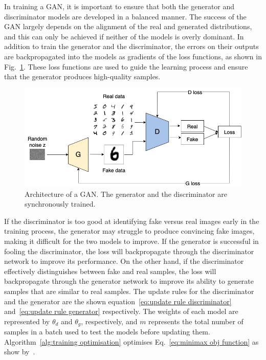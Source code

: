 \noindent In training a GAN, it is important to ensure that both the generator and discriminator models are developed in a balanced manner. The success of the GAN largely depends on the alignment of the real and generated distributions, and this can only be achieved if neither of the models is overly dominant.
In addition to train the generator and the discriminator, the errors on their outputs are backpropagated into the models as gradients of the loss functions, as shown in Fig.~\ref{fig:GAN architecture w loss}. These loss functions are used to guide the learning process and ensure that the generator produces high-quality samples.
\begin{figure}[!ht]
\centering
  \includegraphics[scale=0.45]{figures/gan-architecture.png}
  \caption{Architecture of a GAN. The generator and the discriminator are synchronously trained.}
  \label{fig:GAN architecture w loss}
\end{figure}
If the discriminator is too good at identifying fake versus real images early in the training process, the generator may struggle to produce convincing fake images, making it difficult for the two models to improve. If the generator is successful in fooling the discriminator, the loss will backpropagate through the discriminator network to improve its performance. On the other hand, if the discriminator effectively distinguishes between fake and real samples, the loss will backpropagate through the generator network to improve its ability to generate samples that are similar to real samples.
The update rules for the discriminator and the generator are the shown equation~\ref{eq:update rule discriminator} and~\ref{eq:update rule generator} respectively. The weights of each model are represented by $\theta_d$ and $\theta_g$, respectively, and $m$ represents the total number of samples in a batch used to test the models before updating them. Algorithm~\ref{alg:training optimisation} optimises Eq.~\ref{eq:minimax obj function} as show by~\cite{GANGoodfellow}.
